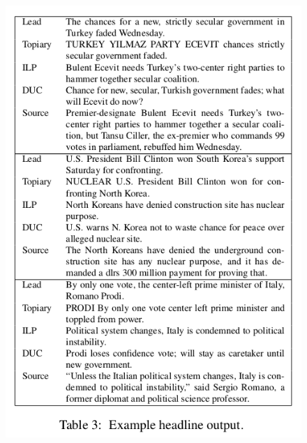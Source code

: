 \documentclass[xcolor={table}]{beamer}
\begin{document}
\begin{frame}[t]{\cite{woodsend2010generation}}
      \begin{figure}[h]
          \centering
      \includegraphics[scale=.25]{images/table3-woodsend10} \\
  \end{figure}
\end{frame}
\end{document}
